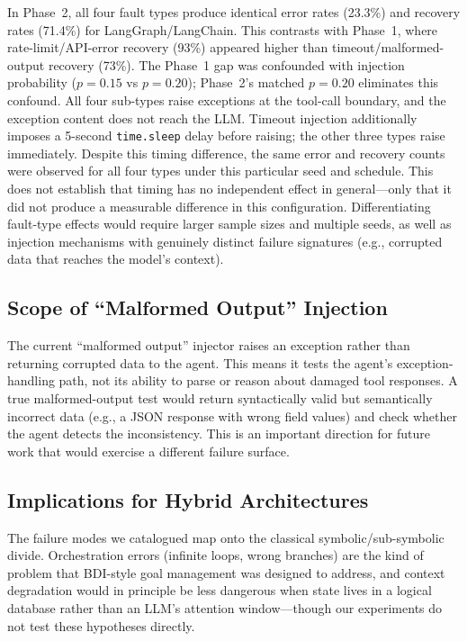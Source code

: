 \documentclass[make,article,submit,moreauthors,pdftex]{mdpi}
\begin{document}
In Phase~2, all four fault types produce identical error rates (23.3\%) and recovery rates (71.4\%) for LangGraph/LangChain. This contrasts with Phase~1, where rate-limit/API-error recovery (93\%) appeared higher than timeout/malformed-output recovery (73\%). The Phase~1 gap was confounded with injection probability ($p = 0.15$ vs $p = 0.20$); Phase~2's matched $p = 0.20$ eliminates this confound. All four sub-types raise exceptions at the tool-call boundary, and the exception content does not reach the LLM. Timeout injection additionally imposes a 5-second \texttt{time.sleep} delay before raising; the other three types raise immediately. Despite this timing difference, the same error and recovery counts were observed for all four types under this particular seed and schedule. This does not establish that timing has no independent effect in general---only that it did not produce a measurable difference in this configuration. Differentiating fault-type effects would require larger sample sizes and multiple seeds, as well as injection mechanisms with genuinely distinct failure signatures (e.g., corrupted data that reaches the model's context).

\subsection{Scope of ``Malformed Output'' Injection}

{\color{orange!80!black}The current ``malformed output'' injector raises an exception rather than returning corrupted data to the agent. This means it tests the agent's exception-handling path, not its ability to parse or reason about damaged tool responses. A true malformed-output test would return syntactically valid but semantically incorrect data (e.g., a JSON response with wrong field values) and check whether the agent detects the inconsistency. This is an important direction for future work that would exercise a different failure surface.}

\subsection{Implications for Hybrid Architectures}

The failure modes we catalogued map onto the classical symbolic/sub-symbolic divide. Orchestration errors (infinite loops, wrong branches) are the kind of problem that BDI-style goal management was designed to address, and context degradation would in principle be less dangerous when state lives in a logical database rather than an LLM's attention window---though our experiments do not test these hypotheses directly.
\end{document}
